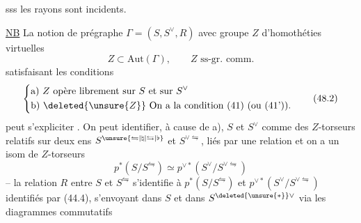 sss les rayons
sont incidents.

\uline{NB} La notion de prégraphe $\Gamma=(S,S^\vee,R)$ avec groupe $Z$ d'homothéties virtuelles
\[
 Z\subset\mathrm{Aut}(\Gamma),\qquad Z\text{ ss-gr. comm.} \tag*{(48.1)}
\]
satisfaisant les conditions
\[
 \left\{\begin{aligned}
 &\text{a) }Z\text{ opère librement sur }S\text{ et sur }S^\vee\\
 &\text{b) }\deleted{\unsure{Z}}\ \text{On a la condition (41) (ou (41')).}
 \end{aligned}\right.\tag*{(48.2)}
\]
peut s'expliciter  . On peut identifier, à cause
de a),  $S$ et $S^\vee$ comme des $Z$-torseurs relatifs
sur deux ens $S^{\unsure{\leftrightharpoons|\natural|\leftrightarrows|\flat}}$ et $S^{\vee\leftrightharpoons}$, liés par une relation
et on a un isom de $Z$-torseurs
\[
 p^*(S/S^\leftrightharpoons)\simeq p^{\vee *}(S^\vee/S^{\vee\leftrightharpoons})
 \tag*{(48.4)}
\]
-- la relation $R$ entre $S$ et $S^\leftrightharpoons$ s'identifie à
$p^*(S/S^\leftrightharpoons)$ et $p^{\vee *}(S^\vee/S^{\vee\leftrightharpoons})$ identifiés par (44.4), s'envoyant
dans $S$ et dans $S^{\deleted{\unsure{*}}\vee}$ via les diagrammes commutatifs

